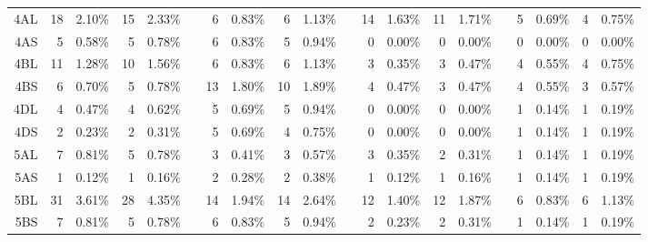 \begin{sidewaystable}
\begin{localsize}{6}{9}
\begin{tabular}{rrrrrrrrrrrrrrrrrrrr}
  \midrule
  4AL            & 18                    & 2.10\%  & 15    & 2.33\%  &    & 6           & 0.83\%  & 6     & 1.13\%  &    & 14                     & 1.63\%  & 11    & 1.71\%  &    & 5           & 0.69\%  & 4     & 0.75\%  \\
 4AS            & 5                     & 0.58\%  & 5     & 0.78\%  &    & 6           & 0.83\%  & 5     & 0.94\%  &    & 0                      & 0.00\%  & 0     & 0.00\%  &    & 0           & 0.00\%  & 0     & 0.00\%  \\
 4BL            & 11                    & 1.28\%  & 10    & 1.56\%  &    & 6           & 0.83\%  & 6     & 1.13\%  &    & 3                      & 0.35\%  & 3     & 0.47\%  &    & 4           & 0.55\%  & 4     & 0.75\%  \\
 4BS            & 6                     & 0.70\%  & 5     & 0.78\%  &    & 13          & 1.80\%  & 10    & 1.89\%  &    & 4                      & 0.47\%  & 3     & 0.47\%  &    & 4           & 0.55\%  & 3     & 0.57\%  \\
 4DL            & 4                     & 0.47\%  & 4     & 0.62\%  &    & 5           & 0.69\%  & 5     & 0.94\%  &    & 0                      & 0.00\%  & 0     & 0.00\%  &    & 1           & 0.14\%  & 1     & 0.19\%  \\
 4DS            & 2                     & 0.23\%  & 2     & 0.31\%  &    & 5           & 0.69\%  & 4     & 0.75\%  &    & 0                      & 0.00\%  & 0     & 0.00\%  &    & 1           & 0.14\%  & 1     & 0.19\%  \\
  \midrule
  5AL            & 7                     & 0.81\%  & 5     & 0.78\%  &    & 3           & 0.41\%  & 3     & 0.57\%  &    & 3                      & 0.35\%  & 2     & 0.31\%  &    & 1           & 0.14\%  & 1     & 0.19\%  \\
 5AS            & 1                     & 0.12\%  & 1     & 0.16\%  &    & 2           & 0.28\%  & 2     & 0.38\%  &    & 1                      & 0.12\%  & 1     & 0.16\%  &    & 1           & 0.14\%  & 1     & 0.19\%  \\
 5BL            & 31                    & 3.61\%  & 28    & 4.35\%  &    & 14          & 1.94\%  & 14    & 2.64\%  &    & 12                     & 1.40\%  & 12    & 1.87\%  &    & 6           & 0.83\%  & 6     & 1.13\%  \\
 5BS            & 7                     & 0.81\%  & 5     & 0.78\%  &    & 6           & 0.83\%  & 5     & 0.94\%  &    & 2                      & 0.23\%  & 2     & 0.31\%  &    & 1           & 0.14\%  & 1     & 0.19\%  \\

\end{tabular}
\end{localsize}
\end{sidewaystable}
